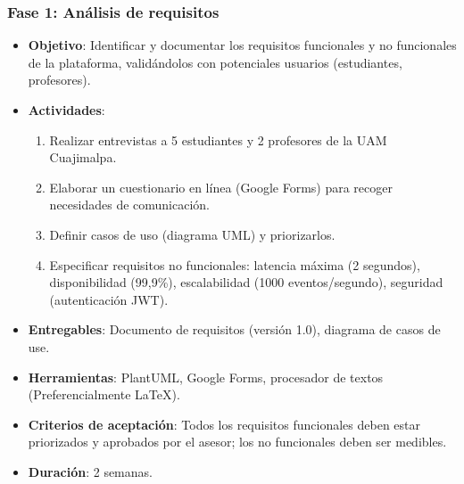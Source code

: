 \subsubsection{Fase 1: Análisis de requisitos}
\begin{itemize}
    \item \textbf{Objetivo}: Identificar y documentar los requisitos funcionales y no funcionales de la plataforma, validándolos con potenciales usuarios (estudiantes, profesores).
    \item \textbf{Actividades}:
        \begin{enumerate}
            \item Realizar entrevistas a 5 estudiantes y 2 profesores de la UAM Cuajimalpa.
            \item Elaborar un cuestionario en línea (Google Forms) para recoger necesidades de comunicación.
            \item Definir casos de uso (diagrama UML) y priorizarlos.
            \item Especificar requisitos no funcionales: latencia máxima (2 segundos), disponibilidad (99,9\%), escalabilidad (1000 eventos/segundo), seguridad (autenticación JWT).
        \end{enumerate}
    \item \textbf{Entregables}: Documento de requisitos (versión 1.0), diagrama de casos de use.
    \item \textbf{Herramientas}: PlantUML, Google Forms, procesador de textos (Preferencialmente LaTeX).
    \item \textbf{Criterios de aceptación}: Todos los requisitos funcionales deben estar priorizados y aprobados por el asesor; los no funcionales deben ser medibles.
    \item \textbf{Duración}: 2 semanas.
\end{itemize}

